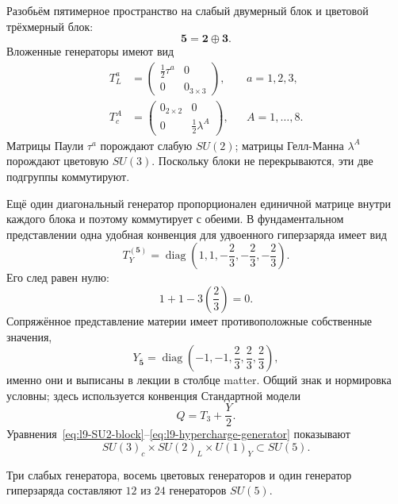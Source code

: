 Разобьём пятимерное пространство на слабый двумерный блок и цветовой трёхмерный блок:
\begin{equation}
\mathbf5=\mathbf2\oplus\mathbf3.
\end{equation}
Вложенные генераторы имеют вид
\begin{align}
T^a_L
&=
\begin{pmatrix}
\tfrac12\tau^a&0\\
0&0_{3\times3}
\end{pmatrix},
&& a=1,2,3,
\label{eq:l9-SU2-block}\\
T^A_c
&=
\begin{pmatrix}
0_{2\times2}&0\\
0&\tfrac12\lambda^A
\end{pmatrix},
&& A=1,\ldots,8.
\label{eq:l9-SU3-block}
\end{align}
Матрицы Паули \(\tau^a\) порождают слабую \(SU(2)\); матрицы Гелл-Манна \(\lambda^A\) порождают цветовую \(SU(3)\). Поскольку блоки не перекрываются, эти две подгруппы коммутируют.

Ещё один диагональный генератор пропорционален единичной матрице внутри каждого блока и поэтому коммутирует с обеими. В фундаментальном представлении одна удобная конвенция для удвоенного гиперзаряда имеет вид
\begin{equation}
T_Y^{(\mathbf5)}=
\operatorname{diag}
\left(
1,1,-\frac23,-\frac23,-\frac23
\right).
\label{eq:l9-hypercharge-generator}
\end{equation}
Его след равен нулю:
\begin{equation}
1+1-3\left(\frac23\right)=0.
\end{equation}
Сопряжённое представление материи имеет противоположные собственные значения,
\begin{equation}
Y_{\overline{\mathbf5}}
=
\operatorname{diag}
\left(
-1,-1,\frac23,\frac23,\frac23
\right),
\label{eq:l9-fivebar-hypercharge}
\end{equation}
именно они и выписаны в лекции в столбце matter. Общий знак и нормировка условны; здесь используется конвенция Стандартной модели
\begin{equation}
Q=T_3+\frac{Y}{2}.
\label{eq:l9-charge}
\end{equation}
Уравнения~\eqref{eq:l9-SU2-block}--\eqref{eq:l9-hypercharge-generator} показывают
\begin{equation}
SU(3)_c\times SU(2)_L\times U(1)_Y
\subset SU(5).
\end{equation}

Три слабых генератора, восемь цветовых генераторов и один генератор гиперзаряда составляют \(12\) из \(24\) генераторов \(SU(5)\).

